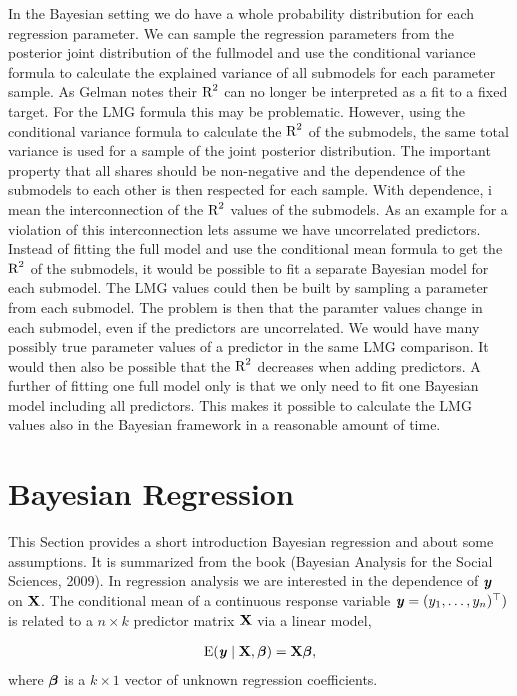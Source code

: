 \documentclass[11pt,a4paper,twoside]{book}
\begin{document}
In the Bayesian setting we do have a whole probability distribution for each regression parameter. We can sample the regression parameters from the posterior joint distribution of the fullmodel and use the conditional variance formula to calculate the explained variance of all submodels for each parameter sample. As Gelman notes their $\text{R}^2$ can no longer be interpreted as a fit to a fixed target. For the LMG formula this may be problematic. However, using the conditional variance formula to calculate the $\text{R}^2$ of the submodels, the same total variance is used for a sample of the joint posterior distribution. The important property that all shares should be non-negative and the dependence of the submodels to each other is then respected for each sample. With dependence, i mean the interconnection of the $\text{R}^2$ values of the submodels. As an example for a violation of this interconnection lets assume we have uncorrelated predictors. Instead of fitting the full model and use the conditional mean formula to get the $\text{R}^2$ of the submodels,  it would be possible to fit a separate Bayesian model for each submodel. The LMG values could then be built by sampling a parameter from each submodel. The problem is then that the paramter values change in each submodel, even if the predictors are uncorrelated. We would have many possibly true parameter values of a predictor in the same LMG comparison. It would then also be possible that the $\text{R}^2$ decreases when adding predictors.  
A further of fitting one full model only  is that we only need to fit one Bayesian model including all predictors. This makes it possible to calculate the LMG values also in the Bayesian framework in a reasonable amount of time. 


\section{Bayesian Regression}
This Section provides a short introduction Bayesian regression and about some assumptions. It is summarized from the book (Bayesian Analysis for the Social Sciences, 2009). 
In regression analysis we are interested in the dependence of ${\textbf{\textit{y}}}$ on ${\mathbf{X}}$. The conditional mean of a continuous response variable ${\textbf{\textit{y}}} = (y_{1}, \dots, y_{n})^\top)$ is related to a $n \times k$ predictor matrix ${\mathbf{X}}$ via a linear model, 

       \begin{align} 
\operatorname{E}({\textbf{\textit{y}}} \mid {\mathbf{X}} , {\boldsymbol{\beta}}) = {\mathbf{X}} {\boldsymbol{\beta}} ,
   \end{align}
where ${\boldsymbol{\beta}}$ is a $k \times 1$ vector of unknown regression coefficients.
\end{document}
